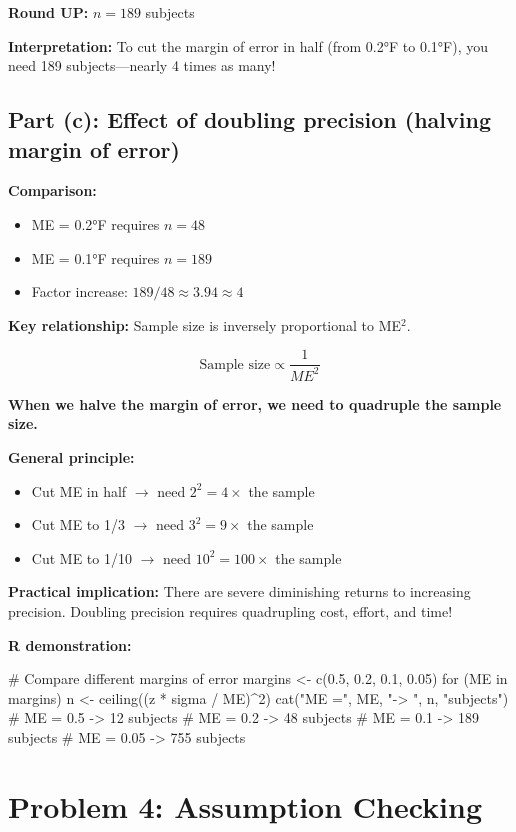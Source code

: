 \documentclass[11pt]{article}
\begin{document}
\textbf{Round UP:} $n = \boxed{189}$ subjects

\textbf{Interpretation:} To cut the margin of error in half (from 0.2°F to 0.1°F), you need 189 subjects---nearly 4 times as many!

\subsection*{Part (c): Effect of doubling precision (halving margin of error)}

\textbf{Comparison:}
\begin{itemize}
\item ME = 0.2°F requires $n = 48$
\item ME = 0.1°F requires $n = 189$
\item Factor increase: $189 / 48 \approx 3.94 \approx 4$
\end{itemize}

\textbf{Key relationship:} Sample size is inversely proportional to ME$^2$.

$$\text{Sample size} \propto \frac{1}{ME^2}$$

\textbf{When we halve the margin of error, we need to quadruple the sample size.}

\textbf{General principle:}
\begin{itemize}
\item Cut ME in half $\to$ need $2^2 = 4\times$ the sample
\item Cut ME to 1/3 $\to$ need $3^2 = 9\times$ the sample
\item Cut ME to 1/10 $\to$ need $10^2 = 100\times$ the sample
\end{itemize}

\textbf{Practical implication:} There are severe diminishing returns to increasing precision. Doubling precision requires quadrupling cost, effort, and time!

\textbf{R demonstration:}
\begin{rcode}
# Compare different margins of error
margins <- c(0.5, 0.2, 0.1, 0.05)
for (ME in margins) {
  n <- ceiling((z * sigma / ME)^2)
  cat("ME =", ME, "-> ", n, "subjects\n")
}
# ME = 0.5 -> 12 subjects
# ME = 0.2 -> 48 subjects
# ME = 0.1 -> 189 subjects
# ME = 0.05 -> 755 subjects
\end{rcode}

\vspace{24pt}

\section*{Problem 4: Assumption Checking}
\end{document}
